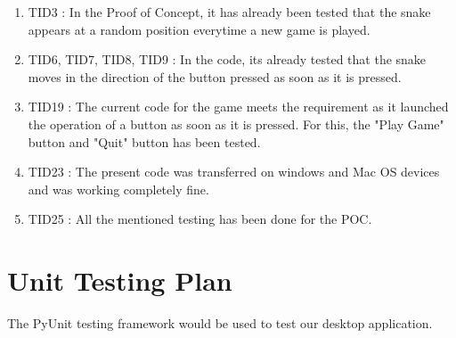 \documentclass[12pt, titlepage]{article}
\begin{document}
\begin{enumerate}
	\item TID3 : In the Proof of Concept, it has already been tested that the snake appears at a random position everytime a new game is played.
	
	\item TID6, TID7, TID8, TID9 : In the code, its already tested that the snake moves in the direction of the button pressed as soon as it is pressed. 
	
	\item TID19 : The current code for the game meets the requirement as it launched the operation of a button as soon as it is pressed. For this, the "Play Game" button and "Quit" button has been tested.
	
	\item TID23 : The present code was transferred on windows and Mac OS devices and was working completely fine.
	
	\item TID25 : All the mentioned testing has been done for the POC.
\end{enumerate}

\section{Unit Testing Plan}
The PyUnit testing framework would be used to test our desktop application.
\end{document}
